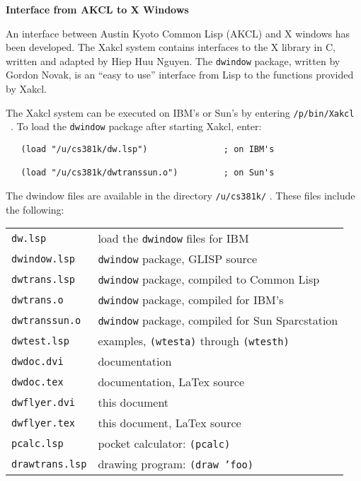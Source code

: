 
\setlength{\oddsidemargin}{0 in}
\setlength{\textwidth}{6.5 in}
\setlength{\textheight}{9.0 in}
\setlength{\parskip}{0.1 in}
\setlength{\parindent}{0.0 in}
\setlength{\topmargin}{-0.4in}



\begin{center} \large{{\bf Interface from AKCL to X Windows}} \end{center}

An interface between Austin Kyoto Common Lisp (AKCL) and X windows has
been \linebreak developed.  The Xakcl system contains interfaces to the
X library in C, written and adapted by Hiep Huu Nguyen.
The {\tt dwindow} package, written by Gordon Novak, is an ``easy to use''
interface from Lisp to the functions provided by Xakcl.

The Xakcl system can be executed on IBM's or Sun's
by entering {\tt /p/bin/Xakcl} \  .  To load the {\tt dwindow} package
after starting Xakcl, enter:
\begin{verbatim}
   (load "/u/cs381k/dw.lsp")               ; on IBM's

   (load "/u/cs381k/dwtranssun.o")         ; on Sun's
\end{verbatim}

The dwindow files are available in the directory {\tt /u/cs381k/} .
These files include the following:

\begin{tabular}{ll}
{\tt dw.lsp}        & load the {\tt dwindow} files for IBM \\
{\tt dwindow.lsp}   & {\tt dwindow} package, GLISP source \\
{\tt dwtrans.lsp}   & {\tt dwindow} package, compiled to Common Lisp \\
{\tt dwtrans.o}     & {\tt dwindow} package, compiled for IBM's \\
{\tt dwtranssun.o}  & {\tt dwindow} package, compiled for Sun Sparcstation \\
{\tt dwtest.lsp}    & examples, {\tt (wtesta)} through {\tt (wtesth)} \\
{\tt dwdoc.dvi}     & documentation \\
{\tt dwdoc.tex}     & documentation, LaTex source \\
{\tt dwflyer.dvi}   & this document \\
{\tt dwflyer.tex}   & this document, LaTex source \\
{\tt pcalc.lsp}     & pocket calculator: {\tt (pcalc)} \\
{\tt drawtrans.lsp} & drawing program: {\tt (draw 'foo)} \\
\end{tabular}


